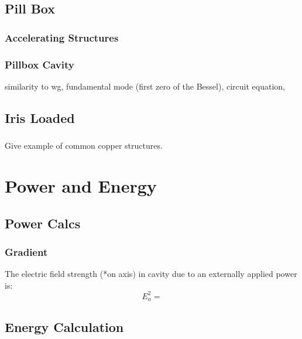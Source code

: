 \documentclass[professionalfonts,t]{beamer}
\begin{document}
\subsection{Pill Box}
\begin{frame}
\frametitle{Accelerating Structures}

\end{frame}

\begin{frame}
	\frametitle{Pillbox Cavity}
	similarity to wg, fundamental mode (first zero of the Bessel), 
	circuit equation, 
\end{frame}

\begin{frame}
\end{frame}

\subsection{Iris Loaded}
\begin{frame}
	\frametitle{}
	Give example of common copper structures. 
\end{frame}




\section{Power and Energy}
\subsection{Power Calcs}
\begin{frame}
	\frametitle{Gradient}
	The electric field strength (*on axis) in cavity due to an externally applied power is:
	\begin{equation}
		E^2_a = 
	\end{equation}

\end{frame}

\subsection{Energy Calculation}
\begin{frame}

\end{frame}
\end{document}
